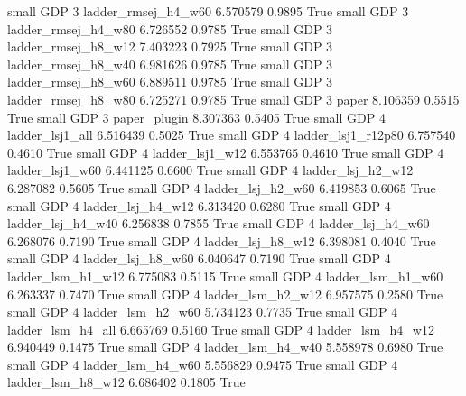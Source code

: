      small      GDP                 3      ladder_rmsej_h4_w60   6.570579      0.9895    True
     small      GDP                 3      ladder_rmsej_h4_w80   6.726552      0.9785    True
     small      GDP                 3      ladder_rmsej_h8_w12   7.403223      0.7925    True
     small      GDP                 3      ladder_rmsej_h8_w40   6.981626      0.9785    True
     small      GDP                 3      ladder_rmsej_h8_w60   6.889511      0.9785    True
     small      GDP                 3      ladder_rmsej_h8_w80   6.725271      0.9785    True
     small      GDP                 3                    paper   8.106359      0.5515    True
     small      GDP                 3             paper_plugin   8.307363      0.5405    True
     small      GDP                 4          ladder_lsj1_all   6.516439      0.5025    True
     small      GDP                 4       ladder_lsj1_r12p80   6.757540      0.4610    True
     small      GDP                 4          ladder_lsj1_w12   6.553765      0.4610    True
     small      GDP                 4          ladder_lsj1_w60   6.441125      0.6600    True
     small      GDP                 4        ladder_lsj_h2_w12   6.287082      0.5605    True
     small      GDP                 4        ladder_lsj_h2_w60   6.419853      0.6065    True
     small      GDP                 4        ladder_lsj_h4_w12   6.313420      0.6280    True
     small      GDP                 4        ladder_lsj_h4_w40   6.256838      0.7855    True
     small      GDP                 4        ladder_lsj_h4_w60   6.268076      0.7190    True
     small      GDP                 4        ladder_lsj_h8_w12   6.398081      0.4040    True
     small      GDP                 4        ladder_lsj_h8_w60   6.040647      0.7190    True
     small      GDP                 4        ladder_lsm_h1_w12   6.775083      0.5115    True
     small      GDP                 4        ladder_lsm_h1_w60   6.263337      0.7470    True
     small      GDP                 4        ladder_lsm_h2_w12   6.957575      0.2580    True
     small      GDP                 4        ladder_lsm_h2_w60   5.734123      0.7735    True
     small      GDP                 4        ladder_lsm_h4_all   6.665769      0.5160    True
     small      GDP                 4        ladder_lsm_h4_w12   6.940449      0.1475    True
     small      GDP                 4        ladder_lsm_h4_w40   5.558978      0.6980    True
     small      GDP                 4        ladder_lsm_h4_w60   5.556829      0.9475    True
     small      GDP                 4        ladder_lsm_h8_w12   6.686402      0.1805    True
